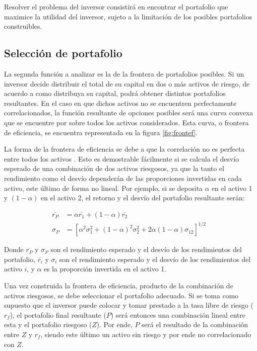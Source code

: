 Resolver el problema del inversor consistirá en encontrar el portafolio que maximice la utilidad del inversor, sujeto a la limitación de los posibles portafolios construibles.

\subsection{Selección de portafolio}

La segunda función a analizar es la de la frontera de portafolios posibles. Si un inversor decide distribuir el total de su capital en dos o más activos de riesgo, de acuerdo a como distribuya su capital, podrá obtener distintos portafolios resultantes. En el caso en que dichos activos no se encuentren perfectamente correlacionados, la función resultante de opciones posibles será una curva convexa que se encuentre por sobre todos los activos considerados. Esta curva, o frontera de eficiencia, se encuentra representada en la figura \ref{fig:frontef}.

La forma de la frontera de eficiencia se debe a que la correlación no es perfecta entre todos los activos \cite[p.430]{sharp}. Esto es demostrable fácilmente si se calcula el desvío esperado de una combinación de dos activos riesgosos, ya que la tanto el rendimiento como el desvío dependerán de las proporciones invertidas en cada activo, este último de forma no lineal. Por ejemplo, si se deposita $\alpha$ en el activo 1 y $(1-\alpha)$ en el activo 2, el retorno y el desvío del portafolio resultante serán: 

\begin{align}
	\overline{r_P} &= \alpha \overline{r_1} + (1-\alpha) \overline{r_2} \label{renddosactivos} \\
	\sigma_P &= \left[ \alpha^2 \sigma_1^2 + (1-\alpha)^2 \sigma_2^2 + 
		2 \alpha (1-\alpha) \sigma_{12} \right]^{1/2} \label{desviodosactivos}
\end{align}

Donde $\overline{r_P}$ y $\sigma_P$ son el rendimiento esperado y el desvío de los rendimientos del portafolio, $\overline{r_i}$ y $\sigma_i$ son el rendimiento esperado y el desvío de los rendimientos del activo $i$, y $\alpha$ es la proporción invertida en el activo 1.

Una vez construida la frontera de eficiencia, producto de la combinación de activos riesgosos, se debe seleccionar el portafolio adecuado. Si se toma como supuesto que el inversor puede colocar y tomar prestado a la tasa libre de riesgo ($r_f$), el portafolio final resultante ($P$) será entonces una combinación lineal entre esta y el portafolio riesgoso ($Z$). Por ende, $P$ será el resultado de la combinación entre $Z$ y $r_f$, siendo este último un activo sin riesgo y por ende no correlacionado con $Z$.


